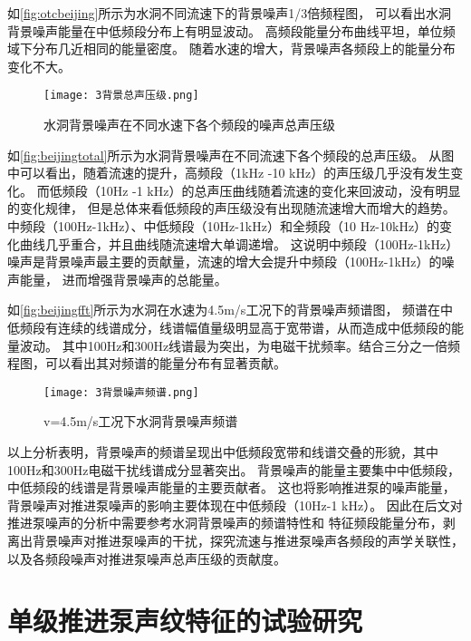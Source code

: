 如\autoref{fig:otcbeijing}所示为水洞不同流速下的背景噪声1/3倍频程图，
可以看出水洞背景噪声能量在中低频段分布上有明显波动。
高频段能量分布曲线平坦，单位频域下分布几近相同的能量密度。
随着水速的增大，背景噪声各频段上的能量分布变化不大。

\begin{figure}[htbp]
    \centering
    \texttt{[image: 3背景总声压级.png]}
    \caption{\label{fig:beijingtotal}水洞背景噪声在不同水速下各个频段的噪声总声压级}
\end{figure}

如\autoref{fig:beijingtotal}所示为水洞背景噪声在不同流速下各个频段的总声压级。
从图中可以看出，随着流速的提升，高频段（1kHz -10 kHz）的声压级几乎没有发生变化。
而低频段（10Hz -1 kHz）的总声压曲线随着流速的变化来回波动，没有明显的变化规律，
但是总体来看低频段的声压级没有出现随流速增大而增大的趋势。
中频段（100Hz-1kHz）、中低频段（10Hz-1kHz）和全频段（10 Hz-10kHz）的变化曲线几乎重合，并且曲线随流速增大单调递增。
这说明中频段（100Hz-1kHz）噪声是背景噪声最主要的贡献量，流速的增大会提升中频段（100Hz-1kHz）的噪声能量，
进而增强背景噪声的总能量。

如\autoref{fig:beijingfft}所示为水洞在水速为4.5m/s工况下的背景噪声频谱图，
频谱在中低频段有连续的线谱成分，线谱幅值量级明显高于宽带谱，从而造成中低频段的能量波动。
其中100Hz和300Hz线谱最为突出，为电磁干扰频率。结合三分之一倍频程图，可以看出其对频谱的能量分布有显著贡献。

\begin{figure}[htbp]
    \centering
    \texttt{[image: 3背景噪声频谱.png]}
    \caption{\label{fig:beijingfft}v=4.5m/s工况下水洞背景噪声频谱}
\end{figure}

以上分析表明，背景噪声的频谱呈现出中低频段宽带和线谱交叠的形貌，其中100Hz和300Hz电磁干扰线谱成分显著突出。
背景噪声的能量主要集中中低频段，中低频段的线谱是背景噪声能量的主要贡献者。
这也将影响推进泵的噪声能量，背景噪声对推进泵噪声的影响主要体现在中低频段（10Hz-1 kHz）。
因此在后文对推进泵噪声的分析中需要参考水洞背景噪声的频谱特性和
特征频段能量分布，剥离出背景噪声对推进泵噪声的干扰，探究流速与推进泵噪声各频段的声学关联性，
以及各频段噪声对推进泵噪声总声压级的贡献度。
\section{单级推进泵声纹特征的试验研究}
